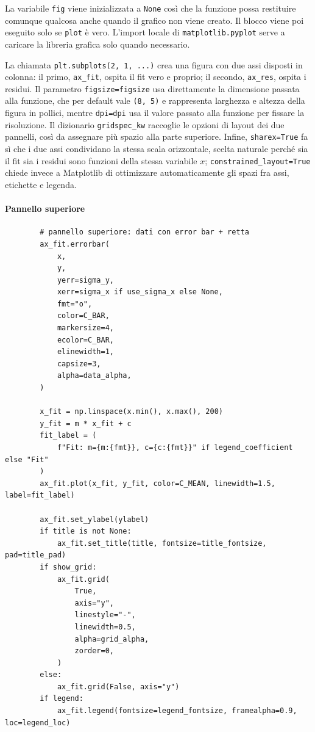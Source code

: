 La variabile \texttt{fig} viene inizializzata a \texttt{None} così che la funzione possa restituire comunque qualcosa anche quando il grafico non viene creato. Il blocco viene poi eseguito solo se \texttt{plot} è vero. L'import locale di \texttt{matplotlib.pyplot} serve a caricare la libreria grafica solo quando necessario.

La chiamata \texttt{plt.subplots(2, 1, ...)} crea una figura con due assi disposti in colonna: il primo, \texttt{ax\_fit}, ospita il fit vero e proprio; il secondo, \texttt{ax\_res}, ospita i residui. Il parametro \texttt{figsize=figsize} usa direttamente la dimensione passata alla funzione, che per default vale \texttt{(8, 5)} e rappresenta larghezza e altezza della figura in pollici, mentre \texttt{dpi=dpi} usa il valore passato alla funzione per fissare la risoluzione. Il dizionario \texttt{gridspec\_kw} raccoglie le opzioni di layout dei due pannelli, così da assegnare più spazio alla parte superiore. Infine, \texttt{sharex=True} fa sì che i due assi condividano la stessa scala orizzontale, scelta naturale perché sia il fit sia i residui sono funzioni della stessa variabile \(x\); \texttt{constrained\_layout=True} chiede invece a Matplotlib di ottimizzare automaticamente gli spazi fra assi, etichette e legenda.
\vspace{-3pt}
\paragraph{Pannello superiore}
\begin{verbatim}
        # pannello superiore: dati con error bar + retta
        ax_fit.errorbar(
            x,
            y,
            yerr=sigma_y,
            xerr=sigma_x if use_sigma_x else None,
            fmt="o",
            color=C_BAR,
            markersize=4,
            ecolor=C_BAR,
            elinewidth=1,
            capsize=3,
            alpha=data_alpha,
        )

        x_fit = np.linspace(x.min(), x.max(), 200)
        y_fit = m * x_fit + c
        fit_label = (
            f"Fit: m={m:{fmt}}, c={c:{fmt}}" if legend_coefficient else "Fit"
        )
        ax_fit.plot(x_fit, y_fit, color=C_MEAN, linewidth=1.5, label=fit_label)

        ax_fit.set_ylabel(ylabel)
        if title is not None:
            ax_fit.set_title(title, fontsize=title_fontsize, pad=title_pad)
        if show_grid:
            ax_fit.grid(
                True,
                axis="y",
                linestyle="-",
                linewidth=0.5,
                alpha=grid_alpha,
                zorder=0,
            )
        else:
            ax_fit.grid(False, axis="y")
        if legend:
            ax_fit.legend(fontsize=legend_fontsize, framealpha=0.9, loc=legend_loc)
\end{verbatim}

